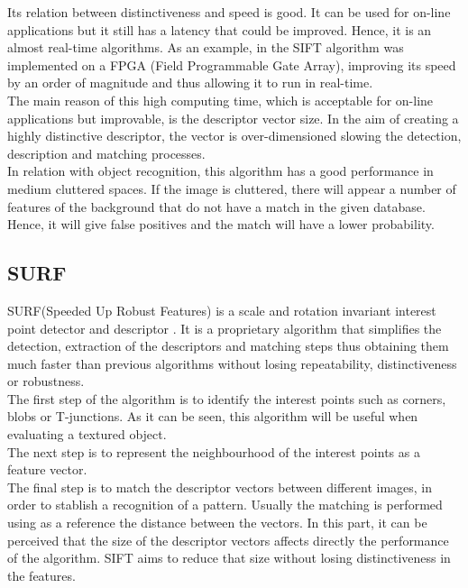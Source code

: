 Its relation between distinctiveness and speed is good. It can be used for on-line applications but it still has a latency that could be improved. Hence, it is an almost real-time algorithms. As an example, in \cite{sift_fpga} the SIFT algorithm was implemented on a FPGA (Field Programmable Gate Array), improving its speed by an order of magnitude and thus allowing it to run in real-time.
\\

The main reason of this high computing time, which is acceptable for on-line applications but improvable, is the descriptor vector size. In the aim of creating a highly distinctive descriptor, the vector is over-dimensioned slowing the detection, description and matching processes. 
\\

In relation with object recognition, this algorithm has a good performance in medium cluttered spaces. If the image is cluttered, there will appear a number of features of the background that do not have a match in the given database. Hence, it will give false positives and the match will have a lower probability. 




\subsection{SURF}
SURF(Speeded Up Robust Features) is a scale and rotation invariant interest point detector and descriptor \cite{surf}. 
It is a proprietary algorithm that simplifies the detection, extraction of the descriptors and matching steps thus obtaining them much faster than previous algorithms without losing repeatability, distinctiveness or robustness. 
\\

The first step of the algorithm is to identify the interest points such as corners, blobs or T-junctions. As it can be seen, this algorithm will be useful when evaluating a textured object. 
\\

The next step is to represent the neighbourhood of the interest points as a feature vector. 
\\

The final step is to match the descriptor vectors between different images, in order to stablish a recognition of a pattern. Usually the matching is performed using as a reference the distance between the vectors. 
In this part, it can be perceived that the size of the descriptor vectors affects directly the performance of the algorithm. SIFT aims to reduce that size without losing distinctiveness in the features. 
\\

